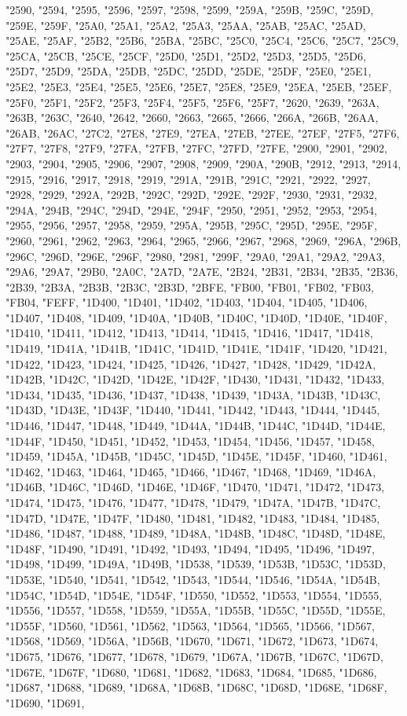 "2590, "2594, "2595, "2596, "2597, "2598, "2599, "259A, "259B, "259C, "259D, "259E, "259F, "25A0, "25A1, "25A2, "25A3, "25AA, "25AB, "25AC, "25AD, "25AE, "25AF, "25B2, "25B6, "25BA, "25BC, "25C0, "25C4, "25C6, "25C7, "25C9, "25CA, "25CB, "25CE, "25CF, "25D0, "25D1, "25D2, "25D3, "25D5, "25D6, "25D7, "25D9, "25DA, "25DB, "25DC, "25DD, "25DE, "25DF, "25E0, "25E1, "25E2, "25E3, "25E4, "25E5, "25E6, "25E7, "25E8, "25E9, "25EA, "25EB, "25EF, "25F0, "25F1, "25F2, "25F3, "25F4, "25F5, "25F6, "25F7, "2620, "2639, "263A, "263B, "263C, "2640, "2642, "2660, "2663, "2665, "2666, "266A, "266B, "26AA, "26AB, "26AC, "27C2, "27E8, "27E9, "27EA, "27EB, "27EE, "27EF, "27F5, "27F6, "27F7, "27F8, "27F9, "27FA, "27FB, "27FC, "27FD, "27FE, "2900, "2901, "2902, "2903, "2904, "2905, "2906, "2907, "2908, "2909, "290A, "290B, "2912, "2913, "2914, "2915, "2916, "2917, "2918, "2919, "291A, "291B, "291C, "2921, "2922, "2927, "2928, "2929, "292A, "292B, "292C, "292D, "292E, "292F, "2930, "2931, "2932, "294A, "294B, "294C, "294D, "294E, "294F, "2950, "2951, "2952, "2953, "2954, "2955, "2956, "2957, "2958, "2959, "295A, "295B, "295C, "295D, "295E, "295F, "2960, "2961, "2962, "2963, "2964, "2965, "2966, "2967, "2968, "2969, "296A, "296B, "296C, "296D, "296E, "296F, "2980, "2981, "299F, "29A0, "29A1, "29A2, "29A3, "29A6, "29A7, "29B0, "2A0C, "2A7D, "2A7E, "2B24, "2B31, "2B34, "2B35, "2B36, "2B39, "2B3A, "2B3B, "2B3C, "2B3D, "2BFE, "FB00, "FB01, "FB02, "FB03, "FB04, "FEFF, "1D400, "1D401, "1D402, "1D403, "1D404, "1D405, "1D406, "1D407, "1D408, "1D409, "1D40A, "1D40B, "1D40C, "1D40D, "1D40E, "1D40F, "1D410, "1D411, "1D412, "1D413, "1D414, "1D415, "1D416, "1D417, "1D418, "1D419, "1D41A, "1D41B, "1D41C, "1D41D, "1D41E, "1D41F, "1D420, "1D421, "1D422, "1D423, "1D424, "1D425, "1D426, "1D427, "1D428, "1D429, "1D42A, "1D42B, "1D42C, "1D42D, "1D42E, "1D42F, "1D430, "1D431, "1D432, "1D433, "1D434, "1D435, "1D436, "1D437, "1D438, "1D439, "1D43A, "1D43B, "1D43C, "1D43D, "1D43E, "1D43F, "1D440, "1D441, "1D442, "1D443, "1D444, "1D445, "1D446, "1D447, "1D448, "1D449, "1D44A, "1D44B, "1D44C, "1D44D, "1D44E, "1D44F, "1D450, "1D451, "1D452, "1D453, "1D454, "1D456, "1D457, "1D458, "1D459, "1D45A, "1D45B, "1D45C, "1D45D, "1D45E, "1D45F, "1D460, "1D461, "1D462, "1D463, "1D464, "1D465, "1D466, "1D467, "1D468, "1D469, "1D46A, "1D46B, "1D46C, "1D46D, "1D46E, "1D46F, "1D470, "1D471, "1D472, "1D473, "1D474, "1D475, "1D476, "1D477, "1D478, "1D479, "1D47A, "1D47B, "1D47C, "1D47D, "1D47E, "1D47F, "1D480, "1D481, "1D482, "1D483, "1D484, "1D485, "1D486, "1D487, "1D488, "1D489, "1D48A, "1D48B, "1D48C, "1D48D, "1D48E, "1D48F, "1D490, "1D491, "1D492, "1D493, "1D494, "1D495, "1D496, "1D497, "1D498, "1D499, "1D49A, "1D49B, "1D538, "1D539, "1D53B, "1D53C, "1D53D, "1D53E, "1D540, "1D541, "1D542, "1D543, "1D544, "1D546, "1D54A, "1D54B, "1D54C, "1D54D, "1D54E, "1D54F, "1D550, "1D552, "1D553, "1D554, "1D555, "1D556, "1D557, "1D558, "1D559, "1D55A, "1D55B, "1D55C, "1D55D, "1D55E, "1D55F, "1D560, "1D561, "1D562, "1D563, "1D564, "1D565, "1D566, "1D567, "1D568, "1D569, "1D56A, "1D56B, "1D670, "1D671, "1D672, "1D673, "1D674, "1D675, "1D676, "1D677, "1D678, "1D679, "1D67A, "1D67B, "1D67C, "1D67D, "1D67E, "1D67F, "1D680, "1D681, "1D682, "1D683, "1D684, "1D685, "1D686, "1D687, "1D688, "1D689, "1D68A, "1D68B, "1D68C, "1D68D, "1D68E, "1D68F, "1D690, "1D691, 